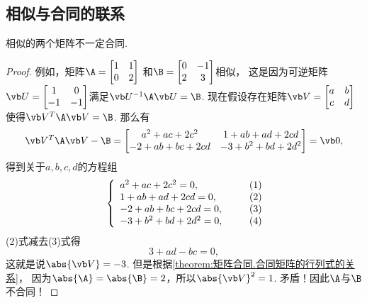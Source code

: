 \subsection{相似与合同的联系}
\begin{proposition}
相似的两个矩阵不一定合同.
\begin{proof}
例如，矩阵\(\A=\begin{bmatrix}
	1 & 1 \\
	0 & 2
\end{bmatrix}\)
和\(\B=\begin{bmatrix}
	0 & -1 \\
	2 & 3
\end{bmatrix}\)相似，
这是因为可逆矩阵\(\P=\begin{bmatrix}
	1 & 0 \\
	-1 & -1
\end{bmatrix}\)满足\(\P^{-1}\A\P=\B\).
现在假设存在矩阵\(\Q=\begin{bmatrix}
	a & b \\
	c & d
\end{bmatrix}\)使得\(\Q^T\A\Q=\B\).
那么有\[
	\Q^T\A\Q-\B
	=\begin{bmatrix}
		a^2+ac+2c^2 & 1+ab+ad+2cd \\
		-2+ab+bc+2cd & -3+b^2+bd+2d^2
	\end{bmatrix}
	=\vb0,
\]
得到关于\(a,b,c,d\)的方程组
\begin{align*}
	\left\{ \begin{array}{l}
		a^2+ac+2c^2 = 0, \\
		1+ab+ad+2cd = 0, \\
		-2+ab+bc+2cd = 0, \\
		-3+b^2+bd+2d^2 = 0,
	\end{array} \right.
	\tag*{$\begin{matrix}(1)\\(2)\\(3)\\(4)\end{matrix}$}
\end{align*}
(2)式减去(3)式得\[
	3+ad-bc=0,
\]
这就是说\(\abs{\Q}=-3\).
但是根据\cref{theorem:矩阵合同.合同矩阵的行列式的关系}，
因为\(\abs{\A}=\abs{\B}=2\)，所以\(\abs{\Q}^2=1\).
矛盾！因此\(\A\)与\(\B\)不合同！
\end{proof}
\end{proposition}

